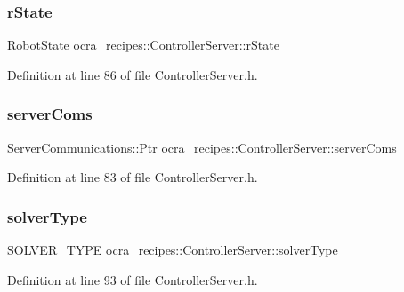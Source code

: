 \subsubsection{\texorpdfstring{r\+State}{rState}}
{\footnotesize\ttfamily \hyperlink{classocra__recipes_1_1RobotState}{Robot\+State} ocra\+\_\+recipes\+::\+Controller\+Server\+::r\+State\hspace{0.3cm}{\ttfamily [protected]}}



Definition at line 86 of file Controller\+Server.\+h.

\hypertarget{classocra__recipes_1_1ControllerServer_af01dc7be410bfebebefedc5f4bb27d1b}{}\label{classocra__recipes_1_1ControllerServer_af01dc7be410bfebebefedc5f4bb27d1b} 
\subsubsection{\texorpdfstring{server\+Coms}{serverComs}}
{\footnotesize\ttfamily Server\+Communications\+::\+Ptr ocra\+\_\+recipes\+::\+Controller\+Server\+::server\+Coms\hspace{0.3cm}{\ttfamily [protected]}}



Definition at line 83 of file Controller\+Server.\+h.

\hypertarget{classocra__recipes_1_1ControllerServer_a7c7d1eda2c96085709f0c3a28fd998a4}{}\label{classocra__recipes_1_1ControllerServer_a7c7d1eda2c96085709f0c3a28fd998a4} 
\subsubsection{\texorpdfstring{solver\+Type}{solverType}}
{\footnotesize\ttfamily \hyperlink{namespaceocra__recipes_afb3bb4de56c2b9472c80d746eb13fed3}{S\+O\+L\+V\+E\+R\+\_\+\+T\+Y\+PE} ocra\+\_\+recipes\+::\+Controller\+Server\+::solver\+Type\hspace{0.3cm}{\ttfamily [protected]}}



Definition at line 93 of file Controller\+Server.\+h.

